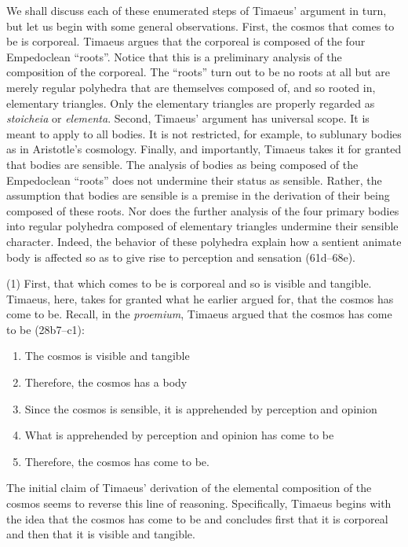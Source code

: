 We shall discuss each of these enumerated steps of Timaeus' argument in turn, but let us begin with some general observations. First, the cosmos that comes to be is corporeal. Timaeus argues that the corporeal is composed of the four Empedoclean ``roots''. Notice that this is a preliminary analysis of the composition of the corporeal. The ``roots'' turn out to be no roots at all but are merely regular polyhedra that are themselves composed of, and so rooted in, elementary triangles. Only the elementary triangles are properly regarded as \emph{stoicheia} or \emph{elementa}. Second, Timaeus' argument has universal scope. It is meant to apply to all bodies. It is not restricted, for example, to sublunary bodies as in Aristotle's cosmology. Finally, and importantly, Timaeus takes it for granted that bodies are sensible. The analysis of bodies as being composed of the Empedoclean ``roots'' does not undermine their status as sensible. Rather, the assumption that bodies are sensible is a premise in the derivation of their being composed of these roots. Nor does the further analysis of the four primary bodies into regular polyhedra composed of elementary triangles undermine their sensible character. Indeed, the behavior of these polyhedra explain how a sentient animate body is affected so as to give rise to perception and sensation (61d--68e). 

(1) First, that which comes to be is corporeal and so is visible and tangible. Timaeus, here, takes for granted what he earlier argued for, that the cosmos has come to be. Recall, in the \emph{proemium}, Timaeus argued that the cosmos has come to be (28b7--c1):
\begin{enumerate}[(1)]
	\item The cosmos is visible and tangible
	\item Therefore, the cosmos has a body
	\item Since the cosmos is sensible, it is apprehended by perception and opinion
	\item What is apprehended by perception and opinion has come to be
	\item Therefore, the cosmos has come to be.
\end{enumerate}
The initial claim of Timaeus' derivation of the elemental composition of the cosmos seems to reverse this line of reasoning. Specifically, Timaeus begins with the idea that the cosmos has come to be and concludes first that it is corporeal and then that it is visible and tangible.


